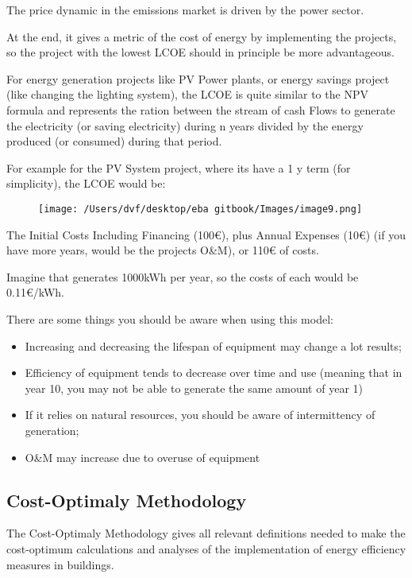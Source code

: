 \documentclass[]{book}
\newcommand{\euro}{€}
\providecommand{\tightlist}{%
  \setlength{\itemsep}{0pt}\setlength{\parskip}{0pt}}
\theoremstyle{definition}
\theoremstyle{definition}
\theoremstyle{definition}
\theoremstyle{remark}
\begin{document}
The price dynamic in the emissions market is driven by the power sector.

At the end, it gives a metric of the cost of energy by implementing the
projects, so the project with the lowest LCOE should in principle be
more advantageous.

For energy generation projects like PV Power plants, or energy savings
project (like changing the lighting system), the LCOE is quite similar
to the NPV formula and represents the ration between the stream of cash
Flows to generate the electricity (or saving electricity) during n years
divided by the energy produced (or consumed) during that period.

For example for the PV System project, where its have a 1 y term (for
simplicity), the LCOE would be:

\begin{figure}[htbp]
\centering
\texttt{[image: /Users/dvf/desktop/eba gitbook/Images/image9.png]}
\caption{}
\end{figure}

The Initial Costs Including Financing (100\euro{}), plus Annual Expenses
(10\euro{}) (if you have more years, would be the projects O\&M), or
110\euro{} of costs.

Imagine that generates 1000kWh per year, so the costs of each would be
0.11\euro{}/kWh.

There are some things you should be aware when using this model:

\begin{itemize}
\tightlist
\item
  Increasing and decreasing the lifespan of equipment may change a lot
  results;
\item
  Efficiency of equipment tends to decrease over time and use (meaning
  that in year 10, you may not be able to generate the same amount of
  year 1)
\item
  If it relies on natural resources, you should be aware of
  intermittency of generation;
\item
  O\&M may increase due to overuse of equipment
\end{itemize}

\subsection{Cost-Optimaly Methodology}\label{cost-optimaly-methodology}

The Cost-Optimaly Methodology gives all relevant definitions needed to
make the cost-optimum calculations and analyses of the implementation of
energy efficiency measures in buildings.
\end{document}
